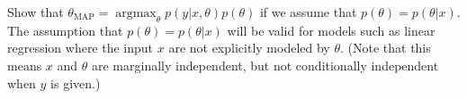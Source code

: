 \item {} Show that $\theta_{\text{MAP}} =
\operatorname*{argmax}_\theta p(y|x, \theta) p(\theta)$ if we assume that
$p(\theta) = p(\theta | x)$. The assumption that $p(\theta) = p(\theta | x)$
will be valid for models such as linear regression where the input $x$
are not explicitly modeled by $\theta$.
(Note that this means $x$ and $\theta$ are marginally independent, but not
conditionally independent when $y$ is given.)

\ifnum{} {
  
} \fi
